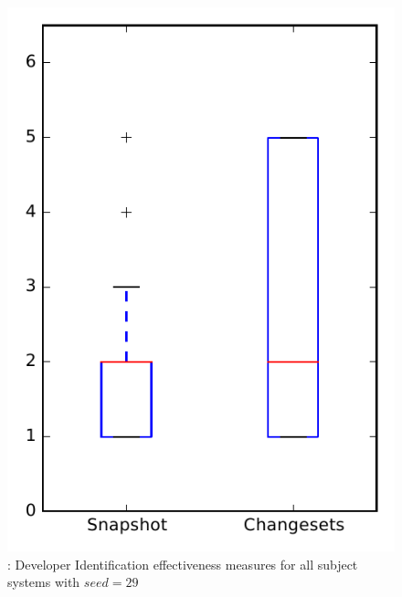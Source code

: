 
\begin{figure}
\centering
\includegraphics[height=0.4\textheight]{figures/dit_seed/rq1_overview_29}
\caption{\rtwo: Developer Identification effectiveness measures for all subject systems with $seed=29$}
\label{fig:dit_seed:rq1:overview}
\end{figure}
